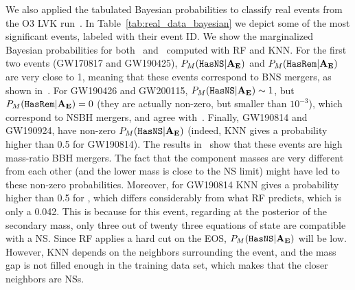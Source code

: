 We also applied the tabulated Bayesian probabilities to classify real events
from the O3 LVK run~\cite{LIGOScientific:2020ibl, LIGOScientific:2021djp}.  In Table~\ref{tab:real_data_bayesian} we depict some of the most significant events, labeled with their event ID.  We show the marginalized Bayesian probabilities for both \hasns\ and \hasrem\ computed with 
\ac{RF} and \ac{KNN}. For the first two events (GW170817 and GW190425),
$P_M({{\tt HasNS}} |\bf{A_E})$ and $P_M({{\tt HasRem}} |\bf{A_E})$ are very close to 1, meaning that these events
correspond to BNS mergers, as shown in~\cite{LIGOScientific:2020ibl,LIGOScientific:2021djp}. 
For GW190426 and GW200115, $P_M({{\tt HasNS}} |{\bf{A_E}}) \sim 1$, but
$P_M({{\tt HasRem}} |{\bf{A_E}}) = 0$ (they are actually non-zero, but smaller than $10^{-3}$), which correspond to NSBH mergers, and agree 
with~\cite{LIGOScientific:2020ibl, LIGOScientific:2021djp}. Finally, GW190814 and GW190924,
have non-zero $P_M({{\tt HasNS}} |\bf{A_E})$ (indeed, \ac{KNN} gives a probability higher than
0.5 for GW190814). The results in~\cite{LIGOScientific:2020ibl, LIGOScientific:2021djp} show that these events are high mass-ratio BBH mergers. The fact that the component masses are very different from each other (and the lower mass is close to the NS limit) might have led to these non-zero probabilities. Moreover, for GW190814 \ac{KNN} gives a probability higher than 0.5 for \hasns, which differs considerably from what \ac{RF} predicts, which is only a 0.042. This is because for this event, regarding at the posterior of the secondary mass, only three out of twenty three equations of state are compatible with a NS. Since \ac{RF} applies a hard cut on the EOS, $P_M({{\tt HasNS}}|{\bf A}_{\bf E})$ will be low. However, \ac{KNN} depends on the neighbors surrounding the event, and the mass gap is not filled enough in the training data set, which makes that the closer neighbors are NSs. 

